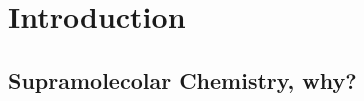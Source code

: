 \documentclass[../Master.tex]{subfiles}
\begin{document}
\chapter{Introduction}
\section{Supramolecolar Chemistry, why?}
\label{sec:supramolecular-chemistry}
\end{document}

